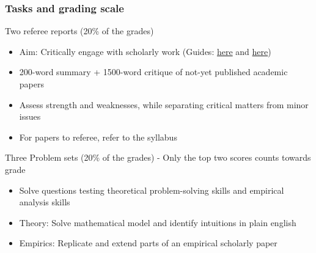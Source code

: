 \documentclass[aspectratio=169]{beamer}
\begin{document}
\begin{frame}
\frametitle{Tasks and grading scale} 

 Two referee reports (20\% of the grades)
\begin{itemize}\setlength\itemsep{3pt}
\item Aim: Critically engage with scholarly work (Guides: \href{https://papers.ssrn.com/sol3/papers.cfm?abstract_id=2547191}{here} and \href{https://scholar.harvard.edu/files/apassalacqua/files/refguidelines_tepe.pdf}{here}) 
  \item 200-word summary + 1500-word critique of not-yet published academic papers
\item Assess strength and weaknesses, while separating critical matters from minor issues 
\item For papers to referee, refer to the syllabus
\end{itemize}\medskip
 Three Problem sets (20\% of the grades) - Only the top two scores counts towards grade
\begin{itemize}\setlength\itemsep{3pt}
\item Solve questions testing theoretical problem-solving skills and empirical analysis skills
\item Theory: Solve mathematical model and identify intuitions in plain english
\item Empirics: Replicate and extend parts of an empirical scholarly paper
\end{itemize}
\end{frame}
\end{document}
